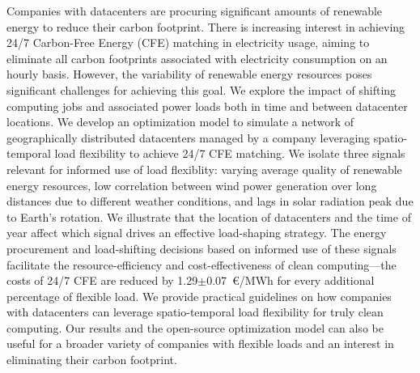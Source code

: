 %

Companies with datacenters are procuring significant amounts of renewable energy to reduce their carbon footprint.
There is increasing interest in achieving 24/7 Carbon-Free Energy (CFE) matching in electricity usage, aiming to eliminate all carbon footprints associated with electricity consumption on an hourly basis.
However, the variability of renewable energy resources poses significant challenges for achieving this goal.
We explore the impact of shifting computing jobs and associated power loads both in time and between datacenter locations.
We develop an optimization model to simulate a network of geographically distributed datacenters managed by a company leveraging spatio-temporal load flexibility to achieve 24/7 CFE matching.
We isolate three signals relevant for informed use of load flexiblity: varying average quality of renewable energy resources, low correlation between wind power generation over long distances due to different weather conditions, and lags in solar radiation peak due to Earth's rotation.
We illustrate that the location of datacenters and the time of year affect which signal drives an effective load-shaping strategy.
The energy procurement and load-shifting decisions based on informed use of these signals facilitate the resource-efficiency and cost-effectiveness of clean computing---the costs of 24/7 CFE are reduced by 1.29$\pm$0.07~\euro/MWh for every additional percentage of flexible load.
We provide practical guidelines on how companies with datacenters can leverage spatio-temporal load flexibility for truly clean computing.
Our results and the open-source optimization model can also be useful for a broader variety of companies with flexible loads and an interest in eliminating their carbon footprint.